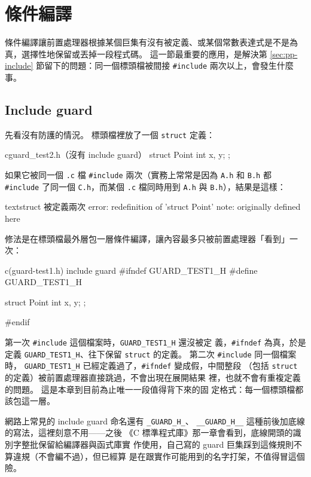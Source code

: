 \section{條件編譯}
\label{sec:pp-cond}

條件編譯讓前置處理器根據某個巨集有沒有被定義、或某個常數表達式是不是為
真，選擇性地保留或丟掉一段程式碼。 這一節最重要的應用，是解決第
\ref{sec:pp-include} 節留下的問題：同一個標頭檔被間接 \texttt{\#include}
兩次以上，會發生什麼事。

\subsection{Include guard}

先看沒有防護的情況。 標頭檔裡放了一個 \texttt{struct} 定義：

\begin{code}{c}{guard\_test2.h（沒有 include guard）}
struct Point { int x, y; };
\end{code}

如果它被同一個 \texttt{.c} 檔 \texttt{\#include} 兩次（實務上常常是因為
\texttt{A.h} 和 \texttt{B.h} 都 \texttt{\#include} 了同一個
\texttt{C.h}，而某個 \texttt{.c} 檔同時用到 \texttt{A.h} 與
\texttt{B.h}），結果是這樣：

\begin{code}{text}{struct 被定義兩次}
error: redefinition of 'struct Point'
note: originally defined here
\end{code}

修法是在標頭檔最外層包一層條件編譯，讓內容最多只被前置處理器「看到」一
次：

\begin{example}{c}{(guard-test1.h) include guard}
#ifndef GUARD_TEST1_H
#define GUARD_TEST1_H

struct Point { int x, y; };

#endif
\end{example}

第一次 \texttt{\#include} 這個檔案時，\texttt{GUARD\_TEST1\_H} 還沒被定
義，\texttt{\#ifndef} 為真，於是定義 \texttt{GUARD\_TEST1\_H}、往下保留
\texttt{struct} 的定義。 第二次 \texttt{\#include} 同一個檔案時，
\texttt{GUARD\_TEST1\_H} 已經定義過了，\texttt{\#ifndef} 變成假，中間整段
（包括 \texttt{struct} 的定義）被前置處理器直接跳過，不會出現在展開結果
裡，也就不會有重複定義的問題。 這是本章到目前為止唯一一段值得背下來的固
定格式：每一個標頭檔都該包這一層。

網路上常見的 include guard 命名還有 \texttt{\_GUARD\_H\_}、
\texttt{\_\_GUARD\_H\_\_} 這種前後加底線的寫法，這裡刻意不用——之後
《C 標準程式庫》那一章會看到，底線開頭的識別字整批保留給編譯器與函式庫實
作使用，自己寫的 guard 巨集踩到這條規則不算違規（不會編不過），但已經算
是在跟實作可能用到的名字打架，不值得冒這個險。

